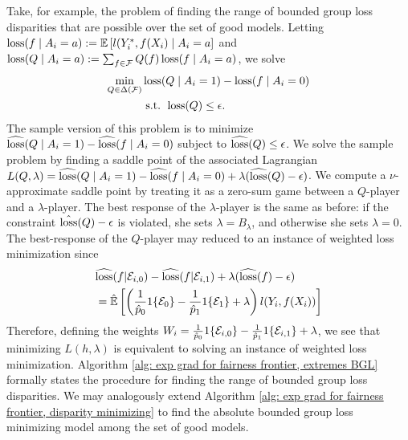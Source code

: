 \documentclass{article}
\begin{document}
Take, for example, the problem of finding the range of bounded group loss disparities that are possible over the set of good models. Letting $\operatorname{loss}(f \mid A_i = a) := \mathbb{E}\left[ l(Y^*_i, f(X_i) \mid A_i = a \right]$ and $\operatorname{loss}(Q \mid A_i = a) := \sum_{f \in \mathcal{F}} Q(f) \operatorname{loss}(f \mid A_i = a)$, we solve
    \begin{align*}
        \min_{Q \in \Delta(\mathcal{F})} & \operatorname{loss}(Q \mid A_i = 1) - \operatorname{loss}(f \mid A_i = 0) \\
        & \mbox{ s.t. } \operatorname{loss}(Q) \leq \epsilon.
    \end{align*}
The sample version of this problem is to minimize $\widehat{\operatorname{loss}}(Q \mid A_i = 1) - \widehat{\operatorname{loss}}(f \mid A_i = 0)$ subject to $\widehat{\operatorname{loss}}(Q) \leq \epsilon$. We solve the sample problem by finding a saddle point of the associated Lagrangian $L(Q, \lambda) = \widehat{\operatorname{loss}}(Q \mid A_i = 1) - \widehat{\operatorname{loss}}(f \mid A_i = 0) + \lambda (\widehat{\operatorname{loss}}(Q) - \epsilon)$. We compute a $\nu$-approximate saddle point by treating it as a zero-sum game between a $Q$-player and a $\lambda$-player. The best response of the $\lambda$-player is the same as before: if the constraint $\hat{\operatorname{loss}}(Q) - \epsilon$ is violated, she sets $\lambda = B_\lambda$, and otherwise she sets $\lambda = 0$. The best-response of the $Q$-player may reduced to an instance of weighted loss minimization since
    \begin{align*}
        & \widehat{\operatorname{loss}}(f | \mathcal{E}_{i,0}) - \widehat{\operatorname{loss}}(f | \mathcal{E}_{i,1}) + \lambda (\widehat{\operatorname{loss}}(f) - \epsilon) \\
        &= \hat{\mathbb{E}}\left[ \left( \frac{1}{\hat p_0} 1\{\mathcal{E}_0\} - \frac{1}{\hat p_1} 1\{\mathcal{E}_1\} + \lambda \right) l(Y_i, f(X_i)) \right]
    \end{align*}
Therefore, defining the weights $W_i = \frac{1}{\hat p_0} 1\{\mathcal{E}_{i,0}\} - \frac{1}{\hat p_1} 1\{\mathcal{E}_{i,1}\} + \lambda$, we see that minimizing $L(h, \lambda)$ is equivalent to solving an instance of weighted loss minimization. Algorithm \ref{alg: exp grad for fairness frontier, extremes BGL} formally states the procedure for finding the range of bounded group loss disparities. We may analogously extend Algorithm \ref{alg: exp grad for fairness frontier, disparity minimizing} to find the absolute bounded group loss minimizing model among the set of good models. 
\end{document}
